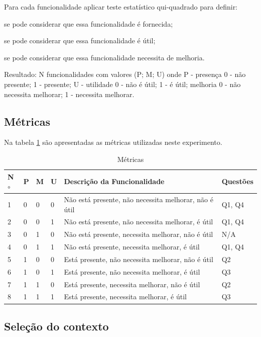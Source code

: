 Para cada funcionalidade aplicar teste estatístico qui-quadrado para definir:

se pode considerar que essa funcionalidade é fornecida;

se pode considerar que essa funcionalidade é útil;

se pode considerar que essa funcionalidade necessita de melhoria.

Resultado: N funcionalidades com valores (P; M; U) onde P - presença {0 - não presente; 1 - presente}; U - utilidade {0 - não é útil; 1 - é útil}; melhoria {0 - não necessita melhorar; 1 - necessita melhorar}.

\subsection{Métricas}

Na tabela \ref{metricas} são apresentadas as métricas utilizadas neste experimento.

\begin{table}[ht!]
	\centering
	\caption{Métricas}
	\label{metricas}
	\begin{tabular}{|p{0.5cm}| p{0.5cm} | p{0.5cm}| p{0.5cm}|p{9cm}|p{3cm}|}
		\hline
		N$\circ$ & P & M & U & Descrição da Funcionalidade & Questões\\
		\hline
		1 & 0 & 0 & 0 & Não está presente, não necessita melhorar, não é útil & Q1, Q4\\
		\hline
		2 & 0 & 0 & 1 & Não está presente, não necessita melhorar, é útil & Q1, Q4\\
		\hline
		3 & 0 & 1 & 0 & Não está presente, necessita melhorar, não é útil & N/A\\
		\hline
		4 & 0 & 1 & 1 & Não está presente, necessita melhorar, é útil & Q1, Q4\\
		\hline
		5 & 1 & 0 & 0 & Está presente, não necessita melhorar, não é útil & Q2\\
		\hline
		6 & 1 & 0 & 1 & Está presente, não necessita melhorar, é útil & Q3\\
		\hline
		7 & 1 & 1 & 0 & Está presente, necessita melhorar, não é útil & Q2\\
		\hline
		8 & 1 & 1 & 1 & Está presente, necessita melhorar, é útil & Q3\\
		\hline
		
		
		
	\end{tabular}
\end{table}	

\subsection{Seleção do contexto}

